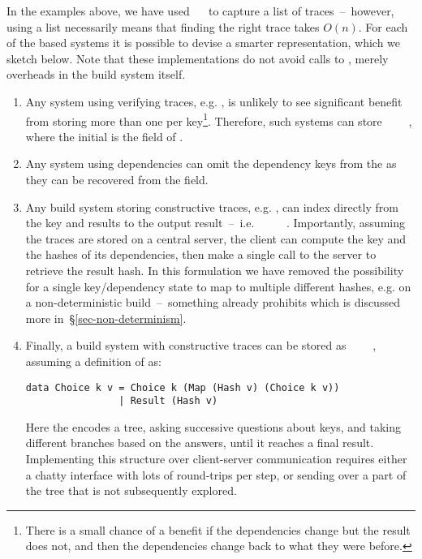 In the examples above, we have used \hs{[Trace}~~\hs{v]} to capture a list
of traces~--~however, using a list necessarily means that finding the right trace
takes $O(n)$. For each of the  based systems it is possible to devise
a smarter representation, which we sketch below. Note that these implementations
do not avoid calls to , merely overheads in the build system itself.

\begin{enumerate}
\item Any system using verifying traces, e.g. \Shake, is unlikely to see significant benefit from storing more than one  per key\footnote{There is a small chance of a benefit if the dependencies change but the result does not, and then the dependencies change back to what they were before.}. Therefore, such systems can store ~~~~, where the initial  is the  field of .
\item Any system using  dependencies can omit the dependency keys from the  as they can be recovered from the  field.
\item Any  build system storing constructive traces, e.g. \Bazel, can index directly from the key and results to the output result~--~i.e. ~~\hs{[Hash}~\hs{v])}~~. Importantly, assuming the traces are stored on a central server, the client can compute the key and the hashes of its dependencies, then make a single call to the server to retrieve the result hash. In this formulation we have removed the possibility for a single key/dependency state to map to multiple different hashes, e.g. on a non-deterministic build~--~something \Bazel already prohibits which is discussed more in~\S\ref{sec-non-determinism}.
\item Finally, a  build system with constructive traces can be stored as ~~~~, assuming a definition of  as:
\begin{verbatim}
data Choice k v = Choice k (Map (Hash v) (Choice k v))
                | Result (Hash v)
\end{verbatim}
Here the  encodes a tree, asking successive questions about keys, and taking different branches based on the answers, until it reaches a final result. Implementing this structure over client-server communication requires either a chatty interface with lots of round-trips per  step, or sending over a part of the tree that is not subsequently explored.
\end{enumerate}
